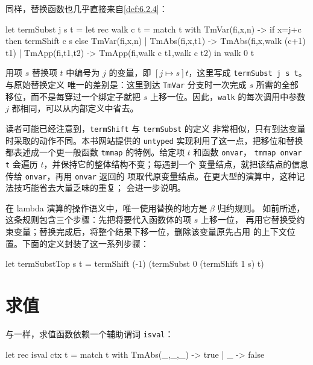 同样，替换函数也几乎直接来自\cref{def:6.2.4}：

\begin{taplocamlcode}
let termSubst j s t =
  let rec walk c t = match t with
      TmVar(fi,x,n) ->
        if x=j+c then termShift c s
        else TmVar(fi,x,n)
    | TmAbs(fi,x,t1) ->
        TmAbs(fi,x,walk (c+1) t1)
    | TmApp(fi,t1,t2) ->
        TmApp(fi,walk c t1,walk c t2)
  in walk 0 t
\end{taplocamlcode}

用项 \(s\) 替换项 \(t\) 中编号为 \(j\) 的变量，即
\([j\mapsto s]t\)，这里写成 \texttt{termSubst j s t}。与原始替换定义
唯一的差别是：这里到达 \texttt{TmVar} 分支时一次完成 \(s\) 所需的全部
移位，而不是每穿过一个绑定子就把 \(s\) 上移一位。因此，\texttt{walk}
的每次调用中参数 \(j\) 都相同，可以从内部定义中省去。

读者可能已经注意到，\texttt{termShift} 与 \texttt{termSubst} 的定义
非常相似，只有到达变量时采取的动作不同。本书网站提供的
\texttt{untyped} 实现利用了这一点，把移位和替换都表述成一个更一般函数
\texttt{tmmap} 的特例。给定项 \(t\) 和函数 \texttt{onvar}，
\texttt{tmmap onvar t} 会遍历 \(t\)，并保持它的整体结构不变；每遇到一个
变量结点，就把该结点的信息传给 \texttt{onvar}，再用 \texttt{onvar} 返回的
项取代原变量结点。在更大型的演算中，这种记法技巧能省去大量乏味的重复；
 会进一步说明。

在 lambda 演算的操作语义中，唯一使用替换的地方是 \(\beta\) 归约规则。
如前所述，这条规则包含三个步骤：先把将要代入函数体的项 \(s\) 上移一位，
再用它替换受约束变量；替换完成后，将整个结果下移一位，删除该变量原先占用
的上下文位置。下面的定义封装了这一系列步骤：

\begin{taplocamlcode}
let termSubstTop s t =
  termShift (-1) (termSubst 0 (termShift 1 s) t)
\end{taplocamlcode}

\section{求值}
\label{sec:7.3}

与一样，求值函数依赖一个辅助谓词
\texttt{isval}：

\begin{taplocamlcode}
let rec isval ctx t = match t with
    TmAbs(_,_,_) -> true
  | _ -> false
\end{taplocamlcode}

